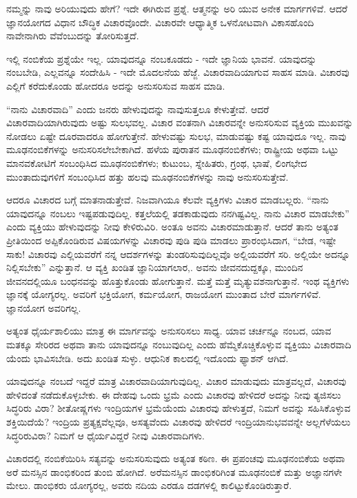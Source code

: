 ನಮ್ಮನ್ನು ನಾವು ಅರಿಯುವುದು ಹೇಗೆ? ಇದೇ ಈಗಿರುವ ಪ್ರಶ್ನೆ. ಆತ್ಮನನ್ನು ಅರಿ ಯುವ ಅನೇಕ ಮಾರ್ಗಗಳಿವೆ. ಆದರೆ ಜ್ಞಾನಯೋಗದ ವಿಧಾನ ಬೌದ್ಧಿಕ ವಿಚಾರವೊಂದೇ. ವಿಚಾರವೇ ಆಧ್ಯಾತ್ಮಿಕ ಒಳನೋಟವಾಗಿ ವಿಕಾಸಹೊಂದಿ ನಾವೇನಾಗಿರು ವೆವೆಂಬುದನ್ನು ತೋರಿಸುತ್ತದೆ.

ಇಲ್ಲಿ ನಂಬಿಕೆಯ ಪ್ರಶ್ನೆಯೇ ಇಲ್ಲ. ಯಾವುದನ್ನೂ ನಂಬಕೂಡದು - ಇದೇ ಜ್ಞಾನಿಯ ಭಾವನೆ. ಯಾವುದನ್ನು ನಂಬಬೇಡಿ, ಎಲ್ಲವನ್ನೂ ಸಂದೇಹಿಸಿ - ಇದೇ ಮೊದಲನೆಯ ಹೆಜ್ಜೆ. ವಿಚಾರವಾದಿಯಾಗುವ ಸಾಹಸ ಮಾಡಿ. ವಿಚಾರವು ಎಲ್ಲಿಗೆ ಕರೆದುಕೊಂಡು ಹೋದರೂ ಅದನ್ನು ಅನುಸರಿಸುವ ಸಾಹಸ ಮಾಡಿ.

“ನಾನು ವಿಚಾರವಾದಿ” ಎಂದು ಜನರು ಹೇಳುವುದನ್ನು ನಾವುಸುತ್ತಲೂ ಕೇಳುತ್ತೇವೆ. ಆದರೆ ವಿಚಾರವಾದಿಯಾಗಿರುವುದು ಅಷ್ಟು ಸುಲಭವಲ್ಲ. ವಿಚಾರ ವಂತನಾಗಿ ವಿಚಾರವನ್ನೇ ಅನುಸರಿಸುವ ವ್ಯಕ್ತಿಯ ಮುಖವನ್ನು ನೋಡಲು ಏಷ್ಟೇ ದೂರವಾದರೂ ಹೋಗುತ್ತೇನೆ. ಹೇಳುವಷ್ಟು ಸುಲಭ, ಮಾಡುವಷ್ಟು ಕಷ್ಟ ಯಾವುದೂ ಇಲ್ಲ. ನಾವು ಮೂಢನಂಬಿಕೆಗಳನ್ನು ಅನುಸರಿಸಲೇಬೇಕಾಗಿದೆ. ಹಳೆಯ ಪುರಾತನ ಮೂಢನಂಬಿಕೆಗಳು; ರಾಷ್ಟ್ರೀಯ ಅಥವಾ ಒಟ್ಟು ಮಾನವಕೋಟಿಗೆ ಸಂಬಂಧಿಸಿದ ಮೂಢನಂಬಿಕೆಗಳು; ಕುಟುಂಬ, ಸ್ನೇಹಿತರು, ಗ್ರಂಥ, ಭಾಷೆ, ಲಿಂಗಭೇದ ಮುಂತಾದುವುಗಳಿಗೆ ಸಂಬಂಧಿಸಿದ ಹತ್ತು ಹಲವು ಮೂಢನಂಬಿಕೆಗಳನ್ನು ನಾವು ಅನುಸರಿಸುತ್ತೇವೆ.

ಆದರೂ ವಿಚಾರದ ಬಗ್ಗೆ ಮಾತನಾಡುತ್ತೇವೆ. ನಿಜವಾಗಿಯೂ ಕೆಲವೇ ವ್ಯಕ್ತಿಗಳು ವಿಚಾರ ಮಾಡಬಲ್ಲರು. “ನಾನು ಯಾವುದನ್ನೂ ನಂಬಲು ಇಷ್ಟಪಡುವುದಿಲ್ಲ. ಕತ್ತಲೆಯಲ್ಲಿ ತಡಕಾಡುವುದು ನನಗಿಷ್ಟವಿಲ್ಲ. ನಾನು ವಿಚಾರ ಮಾಡಬೇಕು” ಎಂದು ವ್ಯಕ್ತಿಯು ಹೇಳುವುದನ್ನು ನೀವು ಕೇಳಿರುವಿರಿ. ಅಂತೂ ಅವನು ವಿಚಾರಮಾಡುತ್ತಾನೆ. ಆದರೆ ತಾನು ಅತ್ಯಂತ ಪ್ರೀತಿಯಿಂದ ಅಪ್ಪಿಕೊಂಡಿರುವ ವಿಷಯಗಳನ್ನು ವಿಚಾರವು ಪುಡಿ ಪುಡಿ ಮಾಡಲು ಪ್ರಾರಂಭಿಸಿದಾಗ, “ಬೇಡ, ಇಷ್ಟೇ ಸಾಕು! ವಿಚಾರವು ಎಲ್ಲಿಯವರೆಗೆ ನನ್ನ ಆದರ್ಶಗಳನ್ನು ತುಂಡರಿಸುವುದಿಲ್ಲವೊ ಅಲ್ಲಿಯವರೆಗೆ ಸರಿ. ಅಲ್ಲಿಯೇ ಅದನ್ನೂ ನಿಲ್ಲಿಸಬೇಕು” ಎನ್ನುತ್ತಾನೆ. ಆ ವ್ಯಕ್ತಿ ಖಂಡಿತ ಜ್ಞಾನಿಯಾಗಲಾರ,. ಅವನು ಜೀವನದುದ್ದಕ್ಕೂ, ಮುಂದಿನ ಜೀವನದಲ್ಲಿಯೂ ಬಂಧನವನ್ನು ಹೊತ್ತುಕೊಂಡು ಹೋಗುತ್ತಾನೆ. ಮತ್ತೆ ಮತ್ತೆ ಮೃತ್ಯುವಶನಾಗುತ್ತಾನೆ. ಇಂಥ ವ್ಯಕ್ತಿಗಳು ಜ್ಞಾನಕ್ಕೆ ಯೋಗ್ಯರಲ್ಲ. ಅವರಿಗೆ ಭಕ್ತಿಯೋಗ, ಕರ್ಮಯೋಗ, ರಾಜಯೋಗ ಮುಂತಾದ ಬೇರೆ ಮಾರ್ಗಗಳಿವೆ. ಜ್ಞಾನಯೋಗ ಅವರಿಗಲ್ಲ.

ಅತ್ಯಂತ ಧೈರ್ಯಶಾಲಿಯು ಮಾತ್ರ ಈ ಮಾರ್ಗವನ್ನು ಅನುಸರಿಸಲು ಸಾಧ್ಯ. ಯಾವ ಚರ್ಚನ್ನೂ ನಂಬದ, ಯಾವ ಮತಕ್ಕೂ ಸೇರಿರದ ಅಥವಾ ತಾನು ಯಾವುದನ್ನೂ ನಂಬುವುದಿಲ್ಲ ಎಂದು ಹೆಮ್ಮೆಕೊಚ್ಚಿಕೊಳ್ಳುವ ವ್ಯಕ್ತಿಯು ವಿಚಾರವಾದಿ ಯೆಂದು ಭಾವಿಸಬೇಡಿ. ಅದು ಖಂಡಿತ ಸುಳ್ಳು. ಆಧುನಿಕ ಕಾಲದಲ್ಲಿ ಇದೊಂದು ಫ್ಯಾಶನ್ ಆಗಿದೆ.

ಯಾವುದನ್ನೂ ನಂಬದೆ ಇದ್ದರೆ ಮಾತ್ರ ವಿಚಾರವಾದಿಯಾಗುವುದಿಲ್ಲ. ವಿಚಾರ ಮಾಡುವುದು ಮಾತ್ರವಲ್ಲದೆ, ವಿಚಾರವು ಹೇಳಿದಂತೆ ನಡೆದುಕೊಳ್ಳಬೇಕು. ಈ ದೇಹವು ಒಂದು ಭ್ರಮೆ ಎಂದು ವಿಚಾರವು ಹೇಳಿದರೆ ಅದನ್ನು ನೀವು ತ್ಯಜಿಸಲು ಸಿದ್ಧರಿರು ವಿರಾ? ಶೀತೋಷ್ಣಗಳು ಇಂದ್ರಿಯಗಳ ಭ್ರಮೆಯೆಂದು ವಿಚಾರವು ಹೇಳುತ್ತದೆ, ನಿಮಗೆ ಅವನ್ನು ಸಹಿಸಿಕೊಳ್ಳುವ ಶಕ್ತಿಯಿದೆಯೆ? ಇಂದ್ರಿಯ ಪ್ರತ್ಯಕ್ಷವೆಲ್ಲವೂ, ಅಸತ್ಯವೆಂದು ವಿಚಾರವು ಹೇಳಿದರೆ ಇಂದ್ರಿಯಾನುಭವವನ್ನೇ ಅಲ್ಲಗೆಳೆಯಲು ಸಿದ್ಧರಿರುವಿರಾ? ನಿಮಗೆ ಆ ಧೈರ್ಯವಿದ್ದರೆ ನೀವು ವಿಚಾರವಾದಿಗಳು.

ವಿಚಾರದಲ್ಲಿ ನಂಬಿಕೆಯಿರಿಸಿ ಸತ್ಯವನ್ನು ಅನುಸರಿಸುವುದು ಅತ್ಯಂತ ಕಠಿಣ. ಈ ಪ್ರಪಂಚವು ಮೂಢನಂಬಿಕೆಯ ಅಥವಾ ಅರೆ ಮನಸ್ಸಿನ ಡಾಂಭಿಕರಿಂದ ತುಂಬಿ ಹೋಗಿದೆ. ಅರೆಮನಸ್ಸಿನ ಡಾಂಭಿಕರಿಗಿಂತ ಮೂಢನಂಬಿಕೆ ಮತ್ತು ಅಜ್ಞಾನಗಳೇ ಮೇಲು. ಡಾಂಭಿಕರು ಯೋಗ್ಯರಲ್ಲ, ಅವರು ನದಿಯ ಎರಡೂ ದಡಗಳಲ್ಲಿ ಕಾಲಿಟ್ಟುಕೊಂಡಿರುತ್ತಾರೆ.

